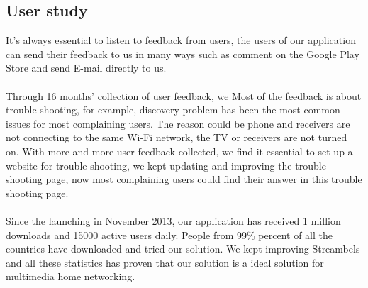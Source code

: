 \subsection{User study}
It's always essential to listen to feedback from users, the users of our application can send their feedback to us in many ways such as comment on the Google Play Store and send E-mail directly to us.\\
\\
Through 16 months' collection of user feedback, we 
Most of the feedback is about trouble shooting, for example, discovery problem has been the most common issues for most complaining users. The reason could be phone and receivers are not connecting to the same Wi-Fi network, the TV or receivers are not turned on. With more and more user feedback collected, we find it essential to set up a website for trouble shooting, we kept updating and improving the trouble shooting page, now most complaining users could find their answer in this trouble shooting page.\\
\\
Since the launching in November 2013, our application has received 1 million
downloads and 15000 active users daily. People from 99\% percent of all the countries have downloaded and tried our solution. We kept improving Streambels and all these statistics has proven that our solution is a ideal solution for multimedia home networking.
